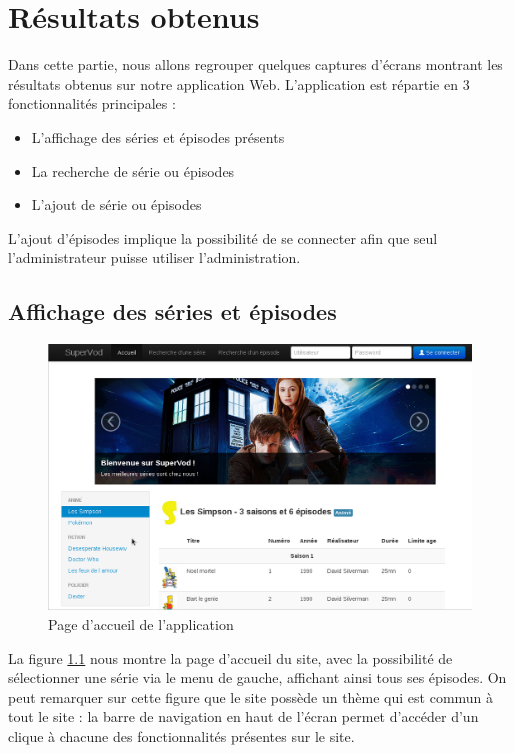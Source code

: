 \documentclass[12pt,a4paper,openany]{book}
\begin{document}
	\chapter{Résultats obtenus}
	Dans cette partie, nous allons regrouper quelques captures d'écrans montrant les résultats obtenus sur notre application Web.
	L'application est répartie en 3 fonctionnalités principales : 
	\begin{itemize}
		\item L'affichage des séries et épisodes présents
		\item La recherche de série ou épisodes
		\item L'ajout de série ou épisodes
	\end{itemize}
	L'ajout d'épisodes implique la possibilité de se connecter afin que seul l'administrateur puisse utiliser l'administration.
	\section{Affichage des séries et épisodes}
	\begin{figure}[H]
		\includegraphics[width=18.0cm]{screens/accueil.png}
		\caption{Page d'accueil de l'application}
		\label{fig:accueil}
	\end{figure}
	La figure \ref{fig:accueil} nous montre la page d'accueil du site, avec la possibilité de sélectionner une série via le menu de gauche, affichant ainsi tous
	ses épisodes. On peut remarquer sur cette figure que le site possède un thème qui est commun à tout le site : la barre de navigation en haut de l'écran
	permet d'accéder d'un clique à chacune des fonctionnalités présentes sur le site.
\end{document}
